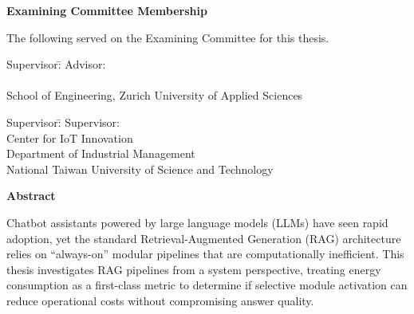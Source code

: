 \pagestyle{plain}
\setcounter{page}{2}


\cleardoublepage
\begin{center}\textbf{\Large Examining Committee Membership}\end{center}
\bigskip

\noindent
The following served on the Examining Committee for this thesis.

\bigskip

\noindent
\begin{tabbing}
Supervisor:\quad \= \kill
Advisor: \> \supnameA \\
\> \supinstituteA \\
\> School of Engineering, Zurich University of Applied Sciences \\
\> \href{mailto:\supmailA}{\supmailA}
\end{tabbing}

\bigskip

\noindent
\begin{tabbing}
Supervisor:\quad \= \kill
Supervisor: \> \supnameB \\
\> Center for IoT Innovation \\
\> Department of Industrial Management \\
\> National Taiwan University of Science and Technology \\
\> \href{mailto:\supmailB}{\supmailB}
\end{tabbing}


\cleardoublepage
\begin{center}\textbf{\Large Abstract}\end{center}
\bigskip

Chatbot assistants powered by large language models (LLMs) have seen
rapid adoption, yet the standard Retrieval-Augmented Generation (RAG)
architecture relies on ``always-on'' modular pipelines that are computationally
inefficient. This thesis investigates RAG pipelines from a system perspective,
treating energy consumption as a first-class metric to determine if selective
module activation can reduce operational costs without compromising answer
quality.

